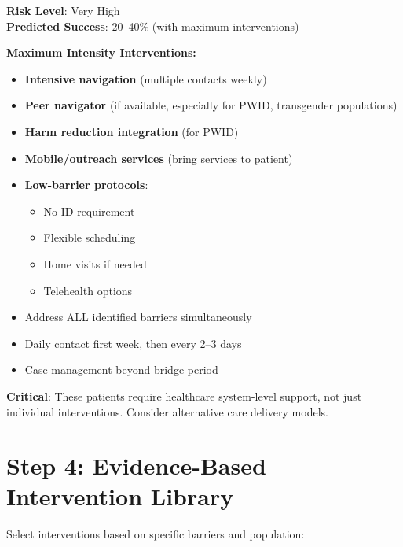 \documentclass[11pt]{article}
\begin{document}
\begin{tcolorbox}[colback=red!15!white,colframe=red!75!black,breakable]
\textbf{Risk Level}: Very High \\
\textbf{Predicted Success}: 20--40\% (with maximum interventions)

\textbf{Maximum Intensity Interventions:}
\begin{itemize}[leftmargin=*]
\item \textbf{Intensive navigation} (multiple contacts weekly)
\item \textbf{Peer navigator} (if available, especially for PWID, transgender populations)
\item \textbf{Harm reduction integration} (for PWID)
\item \textbf{Mobile/outreach services} (bring services to patient)
\item \textbf{Low-barrier protocols}:
\begin{itemize}
\item No ID requirement
\item Flexible scheduling
\item Home visits if needed
\item Telehealth options
\end{itemize}
\item Address ALL identified barriers simultaneously
\item Daily contact first week, then every 2--3 days
\item Case management beyond bridge period
\end{itemize}

\textbf{Critical}: These patients require healthcare system-level support, not just individual interventions. Consider alternative care delivery models.
\end{tcolorbox}

\section{Step 4: Evidence-Based Intervention Library}

Select interventions based on specific barriers and population:
\end{document}
